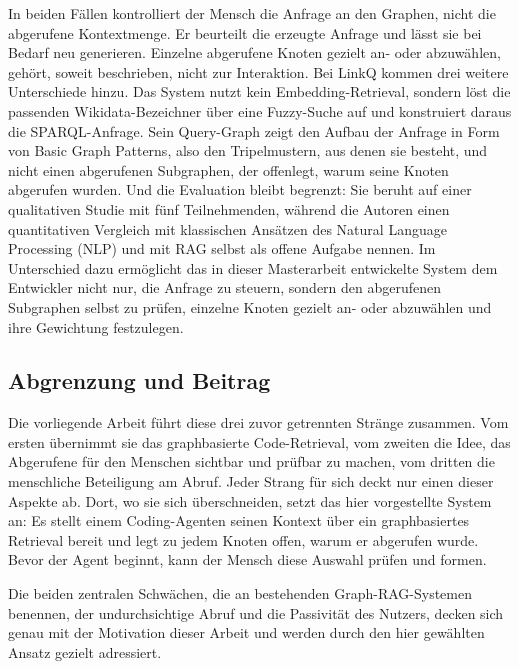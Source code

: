 In beiden Fällen kontrolliert der Mensch die Anfrage an den Graphen, nicht die abgerufene Kontextmenge. Er beurteilt die erzeugte Anfrage und lässt sie bei Bedarf neu generieren. Einzelne abgerufene Knoten gezielt an- oder abzuwählen, gehört, soweit beschrieben, nicht zur Interaktion. Bei LinkQ kommen drei weitere Unterschiede hinzu. Das System nutzt kein Embedding-Retrieval, sondern löst die passenden Wikidata-Bezeichner über eine Fuzzy-Suche auf und konstruiert daraus die SPARQL-Anfrage. Sein Query-Graph zeigt den Aufbau der Anfrage in Form von Basic Graph Patterns, also den Tripelmustern, aus denen sie besteht, und nicht einen abgerufenen Subgraphen, der offenlegt, warum seine Knoten abgerufen wurden. Und die Evaluation bleibt begrenzt: Sie beruht auf einer qualitativen Studie mit fünf Teilnehmenden, während die Autoren einen quantitativen Vergleich mit klassischen Ansätzen des Natural Language Processing (NLP) und mit RAG selbst als offene Aufgabe nennen. Im Unterschied dazu ermöglicht das in dieser Masterarbeit entwickelte System dem Entwickler nicht nur, die Anfrage zu steuern, sondern den abgerufenen Subgraphen selbst zu prüfen, einzelne Knoten gezielt an- oder abzuwählen und ihre Gewichtung festzulegen.

\subsection{Abgrenzung und Beitrag}

Die vorliegende Arbeit führt diese drei zuvor getrennten Stränge zusammen. Vom ersten übernimmt sie das graphbasierte Code-Retrieval, vom zweiten die Idee, das Abgerufene für den Menschen sichtbar und prüfbar zu machen, vom dritten die menschliche Beteiligung am Abruf. Jeder Strang für sich deckt nur einen dieser Aspekte ab. Dort, wo sie sich überschneiden, setzt das hier vorgestellte System an: Es stellt einem Coding-Agenten seinen Kontext über ein graphbasiertes Retrieval bereit und legt zu jedem Knoten offen, warum er abgerufen wurde. Bevor der Agent beginnt, kann der Mensch diese Auswahl prüfen und formen.

Die beiden zentralen Schwächen, die \textcite{pusch2026hitlkgqa} an bestehenden Graph-RAG-Systemen benennen, der undurchsichtige Abruf und die Passivität des Nutzers, decken sich genau mit der Motivation dieser Arbeit und werden durch den hier gewählten Ansatz gezielt adressiert.

